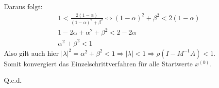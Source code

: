 Daraus folgt:
\begin{align*}
&1<\frac{2(1-\alpha)}{(1-\alpha)^2+\beta^2} \Leftrightarrow (1-\alpha)^2+\beta^2<2(1-\alpha)\\
&1-2\alpha+\alpha^2+\beta^2<2-2\alpha\\
&\alpha^2+\beta^2<1
\end{align*}
Also gilt auch hier $|\lambda|^2=\alpha^2+\beta^2<1 \Rightarrow |\lambda|<1 \Rightarrow \rho(I-M^{-1}A)<1$.\\
Somit konvergiert das Einzelschrittverfahren für alle Startwerte $x^{(0)}$.
\begin{flushright}
Q.e.d.
\end{flushright}